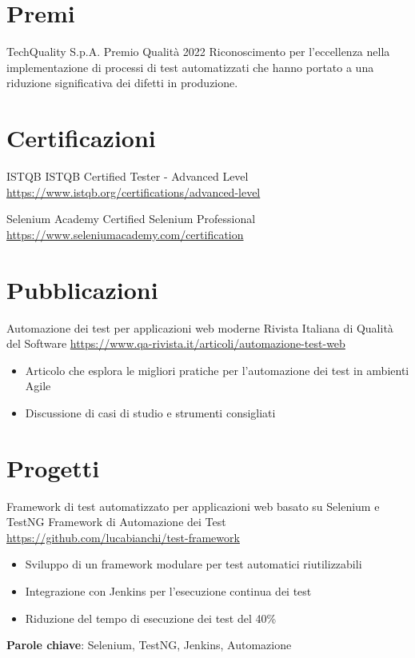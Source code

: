\documentclass[a4paper, serif, 10pt]{moderncv}
\begin{document}
\section{Premi}

        {TechQuality S.p.A.}
        {Premio Qualità 2022}
        {}
        {}
        {Riconoscimento per l'eccellenza nella implementazione di processi di test automatizzati che hanno portato a una riduzione significativa dei difetti in produzione.}
\section{Certificazioni}

        {ISTQB}
        {ISTQB Certified Tester - Advanced Level}
        {\url{https://www.istqb.org/certifications/advanced-level}}
        {}
        {}

        {Selenium Academy}
        {Certified Selenium Professional}
        {\url{https://www.seleniumacademy.com/certification}}
        {}
        {}
\section{Pubblicazioni}

        {Automazione dei test per applicazioni web moderne}
        {Rivista Italiana di Qualità del Software}
        {\url{https://www.qa-rivista.it/articoli/automazione-test-web}}
        {}
        {\begin{itemize}
\item Articolo che esplora le migliori pratiche per l'automazione dei test in ambienti Agile
\item Discussione di casi di studio e strumenti consigliati
\end{itemize}}
\section{Progetti}

        {Framework di test automatizzato per applicazioni web basato su Selenium e TestNG}
        {Framework di Automazione dei Test}
        {\url{https://github.com/lucabianchi/test-framework}}
        {}
        {\begin{itemize}
\item Sviluppo di un framework modulare per test automatici riutilizzabili
\item Integrazione con Jenkins per l'esecuzione continua dei test
\item Riduzione del tempo di esecuzione dei test del 40\%
\end{itemize}
\textbf{Parole chiave}: Selenium, TestNG, Jenkins, Automazione}
\end{document}
